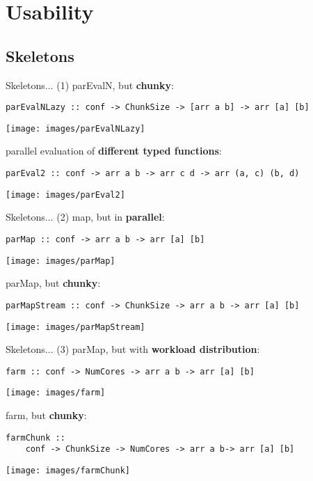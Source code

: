 \section{Usability}
\subsection{Skeletons}
\begin{frame}[fragile]{Skeletons... (1)}
parEvalN, but \textbf{chunky}:
\begin{lstlisting}[frame=htrbl]
parEvalNLazy :: conf -> ChunkSize -> [arr a b] -> arr [a] [b]
\end{lstlisting}
\begin{center}
\texttt{[image: images/parEvalNLazy]}
\end{center}
parallel evaluation of \textbf{different typed functions}:
\begin{lstlisting}[frame=htrbl]
parEval2 :: conf -> arr a b -> arr c d -> arr (a, c) (b, d)
\end{lstlisting}
\begin{center}
\texttt{[image: images/parEval2]}
\end{center}
\end{frame}
\begin{frame}[fragile]{Skeletons... (2)}
map, but in \textbf{parallel}:
\begin{lstlisting}[frame=htrbl]
parMap :: conf -> arr a b -> arr [a] [b]
\end{lstlisting}
\begin{center}
\texttt{[image: images/parMap]}
\end{center}
parMap, but \textbf{chunky}:
\begin{lstlisting}[frame=htrbl]
parMapStream :: conf -> ChunkSize -> arr a b -> arr [a] [b]
\end{lstlisting}
\begin{center}
\texttt{[image: images/parMapStream]}
\end{center}
\end{frame}
\begin{frame}[fragile]{Skeletons... (3)}
parMap, but with \textbf{workload distribution}:
\begin{lstlisting}[frame=htrbl]
farm :: conf -> NumCores -> arr a b -> arr [a] [b]
\end{lstlisting}
\begin{center}
\texttt{[image: images/farm]}
\end{center}
farm, but \textbf{chunky}:
\begin{lstlisting}[frame=htrbl]
farmChunk ::
	conf -> ChunkSize -> NumCores -> arr a b-> arr [a] [b]
\end{lstlisting}
\begin{center}
\texttt{[image: images/farmChunk]}
\end{center}
\end{frame}